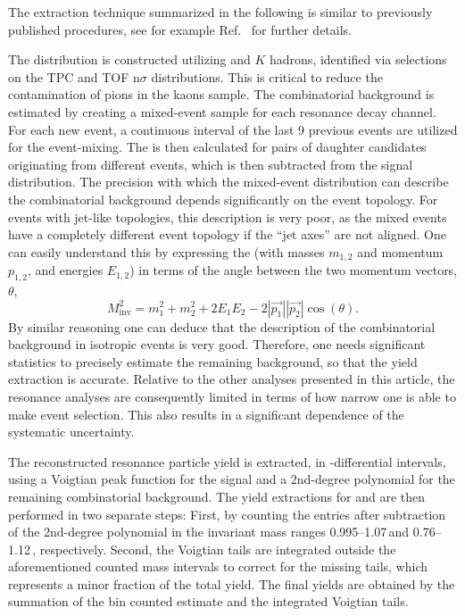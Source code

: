 The extraction technique summarized in the following is similar to previously published procedures, see for example Ref.~\cite{alice_resonance} for further details.

The \Minv distribution is constructed utilizing \PI and $K$ hadrons,  identified via selections on the TPC and TOF n$\sigma$ distributions. This is critical to reduce the contamination of pions in the kaons sample. The combinatorial background is estimated by creating a mixed-event \Minv sample for each resonance decay channel. For each new event, a continuous interval of the last 9 previous events are utilized for the event-mixing. The \Minv is then calculated for pairs of daughter candidates originating from different events, which is then subtracted from the signal distribution. The precision with which the mixed-event distribution can describe the combinatorial background depends significantly on the event topology. For events with jet-like topologies, this description is very poor, as the mixed events have a completely different event topology if the ``jet axes'' are not aligned. One can easily understand this by expressing the \Minv (with masses $m_{1,2}$ and
momentum $p_{1,2}$, and energies $E_{1,2}$) in terms of the angle between the two momentum vectors, $\theta$,
\begin{equation}
M_{\textrm{inv}}^2 = m_1^2 + m_2^2 + 2E_1E_2 - 2|\vec{p_1}||\vec{p_2}|\cos{(\theta)}.
\label{Eq1}
\end{equation} By similar reasoning one can deduce that the description of the combinatorial background in isotropic events is very good. Therefore, one needs significant statistics to precisely estimate the remaining background, so that the yield extraction is accurate. Relative to the other analyses presented in this article, the resonance analyses are consequently limited in terms of how narrow one is able to make \SOPT event selection. This also results in a significant \SOPT dependence of the systematic uncertainty.

 
The reconstructed resonance particle yield is extracted, in \pt-differential intervals, using a Voigtian peak function for the signal and a 2nd-degree polynomial for the remaining combinatorial background. The yield extractions for \PHI and \KSTAR are then performed in two separate steps: First, by counting the entries after subtraction of the 2nd-degree polynomial in the invariant mass ranges 0.995--1.07\,\gev and 0.76--1.12\,\gev, respectively. Second, the Voigtian tails are integrated outside the aforementioned counted mass intervals to correct for the missing tails, which represents a minor fraction of the total yield. The final yields are obtained by the summation of the bin counted estimate and the integrated Voigtian tails.                                             
